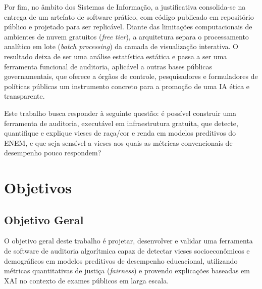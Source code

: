 Por fim, no âmbito dos Sistemas de Informação, a justificativa consolida-se na entrega de um artefato de software prático, com código publicado em repositório público e projetado para ser replicável. Diante das limitações computacionais de ambientes de nuvem gratuitos (\textit{free tier}), a arquitetura separa o processamento analítico em lote (\textit{batch processing}) da camada de visualização interativa. O resultado deixa de ser uma análise estatística estática e passa a ser uma ferramenta funcional de auditoria, aplicável a outras bases públicas governamentais, que oferece a órgãos de controle, pesquisadores e formuladores de políticas públicas um instrumento concreto para a promoção de uma IA ética e transparente.

Este trabalho busca responder à seguinte questão: é possível construir uma ferramenta de auditoria, executável em infraestrutura gratuita, que detecte, quantifique e explique vieses de raça/cor e renda em modelos preditivos do ENEM, e que seja sensível a vieses aos quais as métricas convencionais de desempenho pouco respondem?

\section{Objetivos}

\subsection{Objetivo Geral}
O objetivo geral deste trabalho é projetar, desenvolver e validar uma ferramenta de software de auditoria algorítmica capaz de detectar vieses socioeconômicos e demográficos em modelos preditivos de desempenho educacional, utilizando métricas quantitativas de justiça (\textit{fairness}) e provendo explicações baseadas em XAI no contexto de exames públicos em larga escala.

